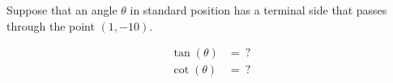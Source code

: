 Suppose that an angle $\theta$ in standard position has a terminal side that passes through the point $(1, -10)$.

$$
\begin{align*}
  \tan(\theta) &=\ ? \\
  \cot(\theta) &=\ ?
\end{align*}
$$
